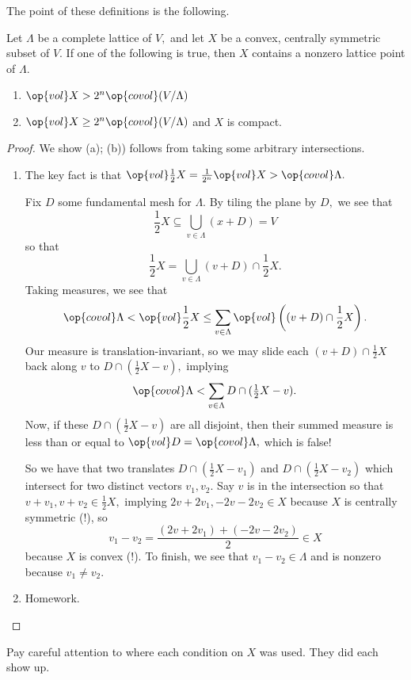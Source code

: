 The point of these definitions is the following.
\begin{theorem}[Minkowski]
    Let $\Lambda$ be a complete lattice of $V,$ and let $X$ be a convex, centrally symmetric subset of $V.$ If one of the following is true, then $X$ contains a nonzero lattice point of $\Lambda.$
    \begin{enumerate}[label=(\alph*)]
        \item $\op{vol}X>2^n\op{covol}(V/\Lambda)$
        \item $\op{vol}X\ge2^n\op{covol}(V/\Lambda)$ and $X$ is compact.
    \end{enumerate}
\end{theorem}
\begin{proof}
    We show (a); (b)) follows from taking some arbitrary intersections.
    \begin{enumerate}[label=(\alph*)]
        \item The key fact is that $\op{vol}\frac12X=\frac1{2^n}\op{vol}X>\op{covol}\Lambda.$

        Fix $D$ some fundamental mesh for $\Lambda.$ By tiling the plane by $D,$ we see that
        \[\frac12X\subseteq\bigcup_{v\in\Lambda}(x+D)=V\]
        so that
        \[\frac12X=\bigcup_{v\in\Lambda}(v+D)\cap\frac12X.\]
        Taking measures, we see that
        \[\op{covol}\Lambda<\op{vol}\frac12X\le\sum_{v\in\Lambda}\op{vol}\left((v+D)\cap\frac12X\right).\]
        Our measure is translation-invariant, so we may slide each $(v+D)\cap\tfrac12X$ back along $v$ to $D\cap(\tfrac12X-v),$ implying
        \[\op{covol}\Lambda<\sum_{v\in\Lambda}D\cap(\tfrac12X-v).\]
        Now, if these $D\cap(\tfrac12X-v)$ are all disjoint, then their summed measure is less than or equal to $\op{vol}D=\op{covol}\Lambda,$ which is false!

        So we have that two translates $D\cap(\tfrac12X-v_1)$ and $D\cap(\tfrac12X-v_2)$ which intersect for two distinct vectors $v_1,v_2.$ Say $v$ is in the intersection so that $v+v_1,v+v_2\in\tfrac12X,$ implying $2v+2v_1,-2v-2v_2\in X$ because $X$ is centrally symmetric (!), so
        \[v_1-v_2=\frac{(2v+2v_1)+(-2v-2v_2)}2\in X\]
        because $X$ is convex (!). To finish, we see that $v_1-v_2\in\Lambda$ and is nonzero because $v_1\ne v_2.$
        \item Homework.
        \qedhere
    \end{enumerate}
\end{proof}
\begin{remark}
    Pay careful attention to where each condition on $X$ was used. They did each show up.
\end{remark}

